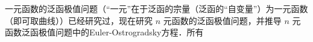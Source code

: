 
一元函数的泛函极值问题（“一元”在于泛函的宗量（泛函的“自变量”）为一元函数（即可取曲线））已经研究过，现在研究 $n$ 元函数的泛函极值问题，并推导 $n$ 元函数泛函极值问题中的Euler-Ostrogradsky方程．所有